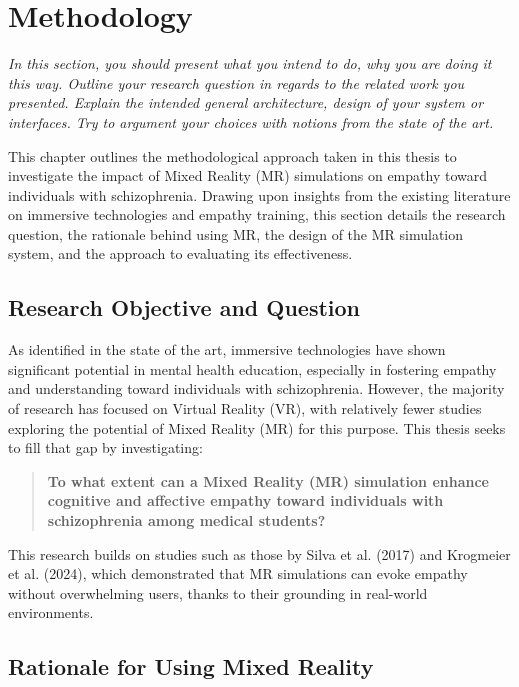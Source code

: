 \chapter{Methodology}
\label{ch:method}

\emph{In this section, you should present what you intend to do, why you are doing it this way. Outline your research question in regards to the related work you presented. Explain the intended general architecture, design of your system or interfaces. Try to argument your choices with notions from the state of the art.}

This chapter outlines the methodological approach taken in this thesis to investigate the impact of Mixed Reality (MR) simulations on empathy toward individuals with schizophrenia. Drawing upon insights from the existing literature on immersive technologies and empathy training, this section details the research question, the rationale behind using MR, the design of the MR simulation system, and the approach to evaluating its effectiveness.

\section{Research Objective and Question}

As identified in the state of the art, immersive technologies have shown significant potential in mental health education, especially in fostering empathy and understanding toward individuals with schizophrenia. However, the majority of research has focused on Virtual Reality (VR), with relatively fewer studies exploring the potential of Mixed Reality (MR) for this purpose. This thesis seeks to fill that gap by investigating:

\begin{quote} \textbf{To what extent can a Mixed Reality (MR) simulation enhance cognitive and affective empathy toward individuals with schizophrenia among medical students?} \end{quote}

This research builds on studies such as those by Silva et al. (2017) and Krogmeier et al. (2024), which demonstrated that MR simulations can evoke empathy without overwhelming users, thanks to their grounding in real-world environments. 

\section{Rationale for Using Mixed Reality}

